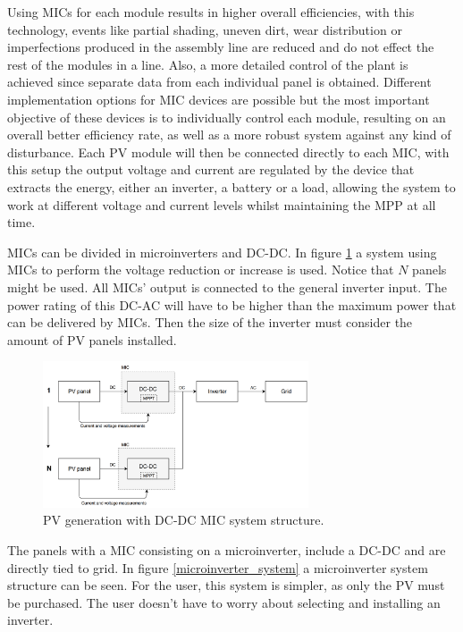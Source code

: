 Using MICs for each module results in higher overall efficiencies, with this technology, events like partial shading, uneven dirt, wear distribution or imperfections produced in the assembly line are reduced and do not effect the rest of the modules in a line. Also, a more detailed control of the plant is achieved since separate data from each individual panel is obtained.
Different implementation options for MIC devices are possible but the most important objective of these devices is to individually control each module, resulting on an overall better efficiency rate, as well as a more robust system against any kind of disturbance. Each PV module will then be connected directly to each MIC, with this setup the output voltage and current are regulated by the device that extracts the energy, either an inverter, a battery or a load, allowing the system to work at different voltage and current levels whilst maintaining the MPP at all time. 

MICs can be divided in microinverters and DC-DC. In figure \ref{MIC_dcdc} a system using MICs to perform the voltage reduction or increase is used. Notice that $N$ panels might be used. All MICs' output is connected to the general inverter input. The power rating of this DC-AC will have to be higher than the maximum power that can be delivered by MICs. Then the size of the inverter must consider the amount of PV panels installed.

\begin{figure}[H]
	\begin{center}
		\includegraphics[width=0.7\textwidth]{../Pictures/MIC_dcdc}
		\caption{PV generation with DC-DC MIC system structure.}
		\label{MIC_dcdc}
	\end{center}	
\end{figure}

The panels with a MIC consisting on a microinverter, include a DC-DC and are directly tied to grid. In figure \ref{microinverter_system} a microinverter system structure can be seen. For the user, this system is simpler, as only the PV must be purchased. The user doesn't have to worry about selecting and installing an inverter. 

